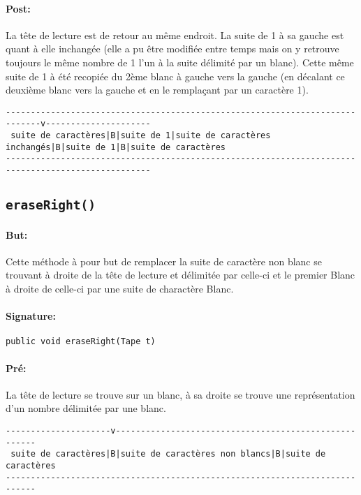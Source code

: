 \documentclass[a4paper,11pt]{article}
\begin{document}
\paragraph{Post:} La tête de lecture est de retour au même endroit. La suite de 1 à sa gauche est quant à elle inchangée (elle a pu être modifiée entre temps mais on y retrouve toujours le même nombre de 1 l'un à la suite délimité par un blanc). Cette même suite de 1 à été recopiée du 2ème blanc à gauche vers la gauche (en décalant ce deuxième blanc vers la gauche et en le remplaçant par un caractère 1). 
\begin{footnotesize}
\begin{verbatim}
-----------------------------------------------------------------------------v---------------------
 suite de caractères|B|suite de 1|suite de caractères inchangés|B|suite de 1|B|suite de caractères
---------------------------------------------------------------------------------------------------
\end{verbatim}
\end{footnotesize}
\subsection{\texttt{eraseRight()}}
\paragraph{But:} Cette méthode à pour but de remplacer la suite de caractère non blanc se trouvant à droite de la tête de lecture et délimitée par celle-ci et le premier Blanc à droite de celle-ci par une suite de charactère Blanc.
\paragraph{Signature:} \texttt{public void eraseRight(Tape t)}
\paragraph{Pré:}
La tête de lecture se trouve sur un blanc, à sa droite se trouve une représentation d'un nombre délimitée par une blanc.
\begin{verbatim}
---------------------v------------------------------------------------------
 suite de caractères|B|suite de caractères non blancs|B|suite de caractères
----------------------------------------------------------------------------
\end{verbatim}
\end{document}

